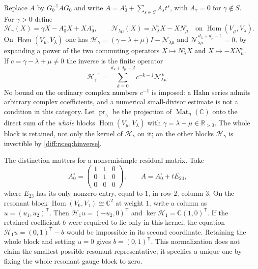 \documentclass[11pt,letterpaper]{article}
\numberwithin{equation}{section}
\theoremstyle{definition}
\theoremstyle{remark}
\newcommand{\R}{\mathbb R}
\newcommand{\C}{\mathbb C}
\newcommand{\Mat}{\operatorname{Mat}}
\newcommand{\Ker}{\operatorname{ker}}
\newcommand{\Hom}{\operatorname{Hom}}
\newcommand{\pr}{\operatorname{pr}}
\begin{document}
Replace $A$ by $G_{0}^{-1}AG_{0}$ and write
$A=A_{0}^{\circ}+\sum_{s\in S}A_{s}t^{s}$, with $A_{\gamma}=0$ for
$\gamma\notin S$. For $\gamma>0$ define
\begin{equation}\label{diff:rs:eq:homological}
 \mathcal H_{\gamma}(X)=\gamma X-A_{0}^{\circ}X+XA_{0}^{\circ},
 \qquad
 \mathcal N_{\lambda\mu}(X)=N^{\circ}_{\lambda}X-XN^{\circ}_{\mu}
 \quad\text{on }\Hom(V_{\mu},V_{\lambda}).
\end{equation}
On $\Hom(V_{\mu},V_{\lambda})$ one has
$\mathcal H_{\gamma}=(\gamma-\lambda+\mu)I-\mathcal N_{\lambda\mu}$ and
$\mathcal N_{\lambda\mu}^{\,d_{\lambda}+d_{\mu}-1}=0$, by expanding a power of
the two commuting operators $X\mapsto N^{\circ}_{\lambda}X$ and
$X\mapsto-XN^{\circ}_{\mu}$. If $c=\gamma-\lambda+\mu\neq0$ the inverse is the
finite operator
\begin{equation}\label{diff:rs:eq:hinverse}
 \mathcal H_{\gamma}^{-1}
 =\sum_{k=0}^{d_{\lambda}+d_{\mu}-2}c^{-k-1}\mathcal N_{\lambda\mu}^{\,k}.
\end{equation}
No bound on the ordinary complex numbers $c^{-1}$ is imposed: a Hahn series
admits arbitrary complex coefficients, and a numerical small-divisor estimate
is not a condition in this category. Let $\pr_{\gamma}$ be the projection of
$\Mat_{n}(\C)$ onto the direct sum of the \emph{whole} blocks
$\Hom(V_{\mu},V_{\lambda})$ with $\gamma=\lambda-\mu\in\R_{>0}$. The whole
block is retained, not only the kernel of $\mathcal H_{\gamma}$ on it; on the
other blocks $\mathcal H_{\gamma}$ is invertible by \cref{diff:rs:eq:hinverse}.

The distinction matters for a nonsemisimple residual matrix. Take
\[
 A_{0}^{\circ}=\begin{pmatrix}1&1&0\\0&1&0\\0&0&0\end{pmatrix},
 \qquad A=A_{0}^{\circ}+tE_{23},
\]
where $E_{23}$ has its only nonzero entry, equal to $1$, in row $2$,
column $3$. On the resonant block
$\Hom(V_{0},V_{1})\cong\C^{2}$ at weight $1$, write a column as
$u=(u_{1},u_{2})^{\mathsf T}$. Then
$\mathcal H_{1}u=(-u_{2},0)^{\mathsf T}$ and
$\Ker\mathcal H_{1}=\C(1,0)^{\mathsf T}$.
If the retained coefficient $b$ were required to lie only in this kernel,
the equation
$\mathcal H_{1}u=(0,1)^{\mathsf T}-b$ would be impossible in its
second coordinate. Retaining the whole block and setting $u=0$ gives
$b=(0,1)^{\mathsf T}$. This normalization does not claim the smallest
possible resonant representative; it specifies a unique one by fixing the
whole resonant gauge block to zero.
\end{document}
